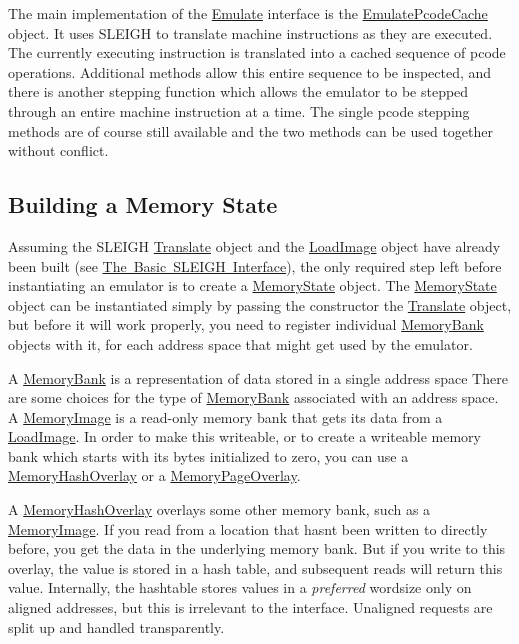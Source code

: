 The main implementation of the \mbox{\hyperlink{class_emulate}{Emulate}} interface is the \mbox{\hyperlink{class_emulate_pcode_cache}{Emulate\+Pcode\+Cache}} object. It uses S\+L\+E\+I\+GH to translate machine instructions as they are executed. The currently executing instruction is translated into a cached sequence of pcode operations. Additional methods allow this entire sequence to be inspected, and there is another stepping function which allows the emulator to be stepped through an entire machine instruction at a time. The single pcode stepping methods are of course still available and the two methods can be used together without conflict.\hypertarget{sleigh_a_p_iemulate_emu_membuild}{}\subsection{Building a Memory State}\label{sleigh_a_p_iemulate_emu_membuild}
Assuming the S\+L\+E\+I\+GH \mbox{\hyperlink{class_translate}{Translate}} object and the \mbox{\hyperlink{class_load_image}{Load\+Image}} object have already been built (see \mbox{\hyperlink{sleighAPIbasic}{The Basic S\+L\+E\+I\+GH Interface}}), the only required step left before instantiating an emulator is to create a \mbox{\hyperlink{class_memory_state}{Memory\+State}} object. The \mbox{\hyperlink{class_memory_state}{Memory\+State}} object can be instantiated simply by passing the constructor the \mbox{\hyperlink{class_translate}{Translate}} object, but before it will work properly, you need to register individual \mbox{\hyperlink{class_memory_bank}{Memory\+Bank}} objects with it, for each address space that might get used by the emulator.

A \mbox{\hyperlink{class_memory_bank}{Memory\+Bank}} is a representation of data stored in a single address space There are some choices for the type of \mbox{\hyperlink{class_memory_bank}{Memory\+Bank}} associated with an address space. A \mbox{\hyperlink{class_memory_image}{Memory\+Image}} is a read-\/only memory bank that gets its data from a \mbox{\hyperlink{class_load_image}{Load\+Image}}. In order to make this writeable, or to create a writeable memory bank which starts with its bytes initialized to zero, you can use a \mbox{\hyperlink{class_memory_hash_overlay}{Memory\+Hash\+Overlay}} or a \mbox{\hyperlink{class_memory_page_overlay}{Memory\+Page\+Overlay}}.

A \mbox{\hyperlink{class_memory_hash_overlay}{Memory\+Hash\+Overlay}} overlays some other memory bank, such as a \mbox{\hyperlink{class_memory_image}{Memory\+Image}}. If you read from a location that hasn\textquotesingle{}t been written to directly before, you get the data in the underlying memory bank. But if you write to this overlay, the value is stored in a hash table, and subsequent reads will return this value. Internally, the hashtable stores values in a {\itshape preferred} wordsize only on aligned addresses, but this is irrelevant to the interface. Unaligned requests are split up and handled transparently.

